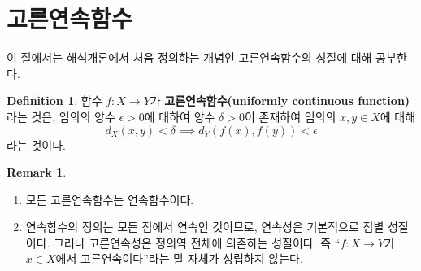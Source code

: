 \documentclass[11pt]{book}
\numberwithin{equation}{chapter}
\def\eps{\epsilon}
\theoremstyle{definition}
\newtheorem{defn}[thm]{Definition}
\newtheorem*{rem}{Remark}
\newenvironment{enum}
	{\begin{enumerate}[label=(\alph*), leftmargin=2\parindent]}
	{\end{enumerate}}
\begin{document}
\section{고른연속함수}

이 절에서는 해석개론에서 처음 정의하는 개념인 고른연속함수의 성질에 대해 공부한다.

\begin{defn}
    함수 \(f : X \to Y\)가 \textbf{고른연속함수(uniformly continuous function)}라는 것은, 임의의 양수 \(\eps > 0\)에 대하여 양수 \(\delta > 0\)이 존재하여 임의의 \(x, y \in X\)에 대해
    \[
    d_X(x, y) < \delta \implies d_Y(f(x), f(y)) < \eps    
    \]
    라는 것이다.
\end{defn}
\begin{rem}
    \quad

    \begin{enum}
        \item 모든 고른연속함수는 연속함수이다.
        \item 연속함수의 정의는 모든 점에서 연속인 것이므로, 연속성은 기본적으로 점별 성질이다. 그러나 고른연속성은 정의역 전체에 의존하는 성질이다. 즉 ``\(f : X \to Y\)가 \(x \in X\)에서 고른연속이다''라는 말 자체가 성립하지 않는다.
    \end{enum}
\end{rem}
\end{document}

